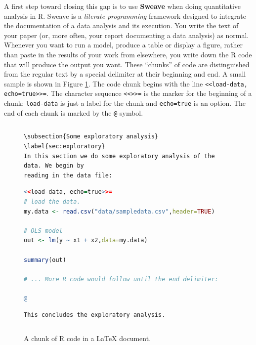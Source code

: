 \documentclass[11pt,article,oneside]{memoir}
\begin{document}
A first step toward closing this gap is to use \textbf{Sweave} when doing quantitative analysis in R. Sweave is a \emph{literate programming} framework designed to integrate the documentation of a data analysis and its execution. You write the text of your paper (or, more often, your report documenting a data analysis) as normal. Whenever you want to run a model, produce a table or display a figure, rather than paste in the results of your work from elsewhere, you write down the R code that will produce the output you want. These ``chunks'' of code are distinguished from the regular text by a special delimiter at their beginning and end. A small sample is shown in Figure \ref{fig:codechunk}. The code chunk begins with the line \lstinline!<<load-data, echo=true>>=!. The character sequence \lstinline!<<>>=! is the marker for the beginning of a chunk: \lstinline!load-data! is just a label for the chunk and \lstinline!echo=true! is an option. The end of each chunk is marked by the \lstinline!@! symbol.


\begin{figure}
\begin{lstlisting}[style=sweave-top]

\end{lstlisting} 
\begin{lstlisting}[language={[latex]tex},numbers=none,style=sweave-tex]   
\subsection{Some exploratory analysis}
\label{sec:exploratory}
In this section we do some exploratory analysis of the data. We begin by
reading in the data file:
\end{lstlisting}
\begin{lstlisting}[language=R,numbers=none,style=sweave-r] 
<<load-data, echo=true>>=
# load the data. 
my.data <- read.csv("data/sampledata.csv",header=TRUE)

# OLS model
out <- lm(y ~ x1 + x2,data=my.data)

summary(out)

# ... More R code would follow until the end delimiter:

@ 
\end{lstlisting}
\begin{lstlisting}[language={[latex]tex},numbers=none,style=sweave-tex] 
% now we are back to normal latex 
This concludes the exploratory analysis. 
\end{lstlisting} 
\begin{lstlisting}[style=sweave-bottom]

\end{lstlisting}
  \caption{A chunk of R code in a LaTeX document.}
\label{fig:codechunk}
\end{figure}
\end{document}
